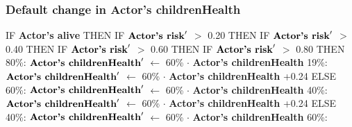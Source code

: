 \documentclass{article}%
\begin{document}
%
\subsubsection{Default change in Actor's childrenHealth}%
\label{ssubsec:Default change in Actor's childrenHealth}%
\begin{flushleft}%
IF %
\textbf{Actor's alive}%
\linebreak%
\hspace*{2em}%
THEN %
IF %
$\mbox{\textbf{Actor's risk}} '$%
$>$%
0.20%
\linebreak%
\hspace*{4em}%
THEN %
IF %
$\mbox{\textbf{Actor's risk}} '$%
$>$%
0.40%
\linebreak%
\hspace*{6em}%
THEN %
IF %
$\mbox{\textbf{Actor's risk}} '$%
$>$%
0.60%
\linebreak%
\hspace*{8em}%
THEN %
IF %
$\mbox{\textbf{Actor's risk}} '$%
$>$%
0.80%
\linebreak%
\hspace*{10em}%
THEN %
\linebreak%
\hspace*{12em}%
80\%: %
$\mbox{\textbf{Actor's childrenHealth}} '$%
$\leftarrow$%
60\%%
$\cdot$%
\textbf{Actor's childrenHealth}%
\linebreak%
\hspace*{12em}%
19\%: %
$\mbox{\textbf{Actor's childrenHealth}} '$%
$\leftarrow$%
60\%%
$\cdot$%
\textbf{Actor's childrenHealth}%
+0.24%
\linebreak%
\hspace*{10em}%
ELSE %
\linebreak%
\hspace*{12em}%
60\%: %
$\mbox{\textbf{Actor's childrenHealth}} '$%
$\leftarrow$%
60\%%
$\cdot$%
\textbf{Actor's childrenHealth}%
\linebreak%
\hspace*{12em}%
40\%: %
$\mbox{\textbf{Actor's childrenHealth}} '$%
$\leftarrow$%
60\%%
$\cdot$%
\textbf{Actor's childrenHealth}%
+0.24%
\linebreak%
\hspace*{8em}%
ELSE %
\linebreak%
\hspace*{10em}%
40\%: %
$\mbox{\textbf{Actor's childrenHealth}} '$%
$\leftarrow$%
60\%%
$\cdot$%
\textbf{Actor's childrenHealth}%
\linebreak%
\hspace*{10em}%
60\%: %

\end{flushleft}
\end{document}
